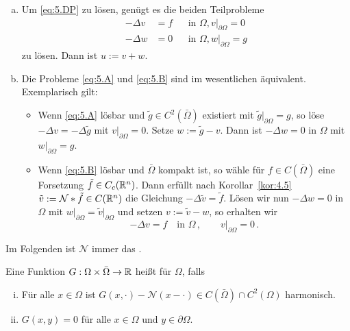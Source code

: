 \begin{bem}
  \label{bem:5.2}
  \begin{enumerate}[(a)]
  \item Um \eqref{eq:5.DP} zu lösen, genügt es die beiden Teilprobleme
    \begin{align}
      \tag{A}\label{eq:5.A}
      -\Delta v&=f &&\text{in }\Omega, v\rvert_{\partial\Omega}=0 \\
      \tag{B}\label{eq:5.B}
      -\Delta w&=0 &&\text{in }\Omega, w\rvert_{\partial\Omega}=g
    \end{align}
    zu lösen. Dann ist $u:=v+w$.
  \item Die Probleme \eqref{eq:5.A} und \eqref{eq:5.B} sind im wesentlichen äquivalent. Exemplarisch gilt:
    \begin{itemize}
    \item Wenn \eqref{eq:5.A} lösbar und $\tilde g\in C^2(\bar\Omega)$ existiert mit $\tilde g\rvert_{\partial\Omega}=g$, so löse $-\Delta v=-\Delta\tilde g$ mit $v\rvert_{\partial\Omega}=0$. Setze $w:=\tilde g-v$. Dann ist $-\Delta w=0$ in $\Omega$ mit $w\rvert_{\partial\Omega}=g$.
    \item Wenn \eqref{eq:5.B} lösbar und $\bar\Omega$ kompakt ist, so wähle für $f\in C(\bar\Omega)$ eine Forsetzung $\tilde f\in C_c(\mathbb{R}^n)$. Dann erfüllt nach Korollar~\ref{kor:4.5} $\tilde v:=\mathcal{N}\ast\tilde f\in C(\mathbb{R}^n)$ die Gleichung $-\Delta\tilde v=\tilde f$. Lösen wir nun $-\Delta w=0$ in $\Omega$ mit $w\rvert_{\partial\Omega}=\tilde v\rvert_{\partial\Omega}$ und setzen $v:=\tilde v-w$, so erhalten wir
      \[
      -\Delta v=f\quad\text{in }\Omega\, ,\qquad v\rvert_{\partial\Omega}=0\, .
      \]
    \end{itemize}
  \end{enumerate}
\end{bem}

Im Folgenden ist $\mathcal{N}$ immer das .

\begin{defi}
  Eine Funktion $G:\Omega\times\bar\Omega\rightarrow\mathbb{R}$ heißt  für $\Omega$, falls
  \begin{enumerate}[(i)]
  \item Für alle $x\in\Omega$ ist $G(x,\cdot)-\mathcal{N}(x-\cdot)\in C(\bar\Omega)\cap C^2(\Omega)$ harmonisch.
  \item $G(x,y)=0$ für alle $x\in\Omega$ und $y\in\partial\Omega$.
  \end{enumerate}
\end{defi}

